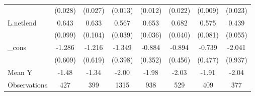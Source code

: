 {\begin{tabular}{l*{7}{c}}
            &     (0.028)         &     (0.027)         &     (0.013)         &     (0.012)         &     (0.022)         &     (0.009)         &     (0.023)         \\
\addlinespace
L.netlend   &       0.643\sym{***}&       0.633\sym{***}&       0.567\sym{***}&       0.653\sym{***}&       0.682\sym{***}&       0.575\sym{***}&       0.439\sym{***}\\
            &     (0.099)         &     (0.104)         &     (0.039)         &     (0.036)         &     (0.040)         &     (0.081)         &     (0.055)         \\
\addlinespace
\_cons      &      -1.286\sym{**} &      -1.216\sym{*}  &      -1.349\sym{***}&      -0.884\sym{**} &      -0.894\sym{*}  &      -0.739         &      -2.041\sym{**} \\
            &     (0.609)         &     (0.619)         &     (0.398)         &     (0.352)         &     (0.456)         &     (0.477)         &     (0.937)         \\
\midrule
Mean Y      &       -1.48         &       -1.34         &       -2.00         &       -1.98         &       -2.03         &       -1.91         &       -2.04         \\
Observations&         427         &         399         &        1315         &         938         &         529         &         409         &         377         \\
\bottomrule
\end{tabular}
}
